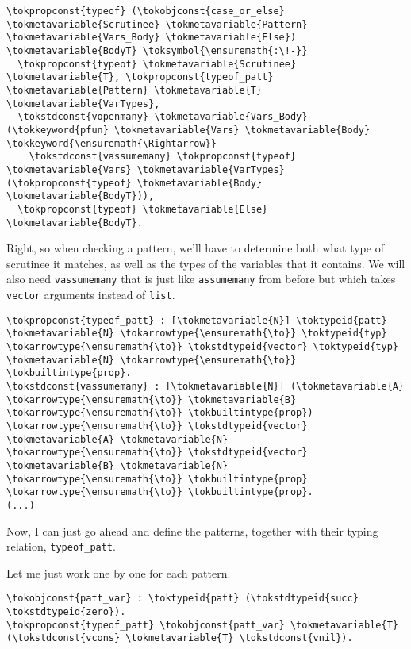 \begin{verbatim}
\tokpropconst{typeof} (\tokobjconst{case_or_else} \tokmetavariable{Scrutinee} \tokmetavariable{Pattern} \tokmetavariable{Vars_Body} \tokmetavariable{Else}) \tokmetavariable{BodyT} \toksymbol{\ensuremath{:\!-}}
  \tokpropconst{typeof} \tokmetavariable{Scrutinee} \tokmetavariable{T}, \tokpropconst{typeof_patt} \tokmetavariable{Pattern} \tokmetavariable{T} \tokmetavariable{VarTypes},
  \tokstdconst{vopenmany} \tokmetavariable{Vars_Body} (\tokkeyword{pfun} \tokmetavariable{Vars} \tokmetavariable{Body} \tokkeyword{\ensuremath{\Rightarrow}}
    \tokstdconst{vassumemany} \tokpropconst{typeof} \tokmetavariable{Vars} \tokmetavariable{VarTypes} (\tokpropconst{typeof} \tokmetavariable{Body} \tokmetavariable{BodyT})),
  \tokpropconst{typeof} \tokmetavariable{Else} \tokmetavariable{BodyT}.
\end{verbatim}

Right, so when checking a pattern, we'll have to determine both what
type of scrutinee it matches, as well as the types of the variables that
it contains. We will also need \texttt{vassumemany} that is just like
\texttt{assumemany} from before but which takes \texttt{vector}
arguments instead of \texttt{list}.

\begin{verbatim}
\tokpropconst{typeof_patt} : [\tokmetavariable{N}] \toktypeid{patt} \tokmetavariable{N} \tokarrowtype{\ensuremath{\to}} \toktypeid{typ} \tokarrowtype{\ensuremath{\to}} \tokstdtypeid{vector} \toktypeid{typ} \tokmetavariable{N} \tokarrowtype{\ensuremath{\to}} \tokbuiltintype{prop}.
\tokstdconst{vassumemany} : [\tokmetavariable{N}] (\tokmetavariable{A} \tokarrowtype{\ensuremath{\to}} \tokmetavariable{B} \tokarrowtype{\ensuremath{\to}} \tokbuiltintype{prop}) \tokarrowtype{\ensuremath{\to}} \tokstdtypeid{vector} \tokmetavariable{A} \tokmetavariable{N} \tokarrowtype{\ensuremath{\to}} \tokstdtypeid{vector} \tokmetavariable{B} \tokmetavariable{N} \tokarrowtype{\ensuremath{\to}} \tokbuiltintype{prop} \tokarrowtype{\ensuremath{\to}} \tokbuiltintype{prop}.
(...)
\end{verbatim}

Now, I can just go ahead and define the patterns, together with their
typing relation, \texttt{typeof\_patt}.

Let me just work one by one for each pattern.

\begin{verbatim}
\tokobjconst{patt_var} : \toktypeid{patt} (\tokstdtypeid{succ} \tokstdtypeid{zero}).
\tokpropconst{typeof_patt} \tokobjconst{patt_var} \tokmetavariable{T} (\tokstdconst{vcons} \tokmetavariable{T} \tokstdconst{vnil}).
\end{verbatim}


